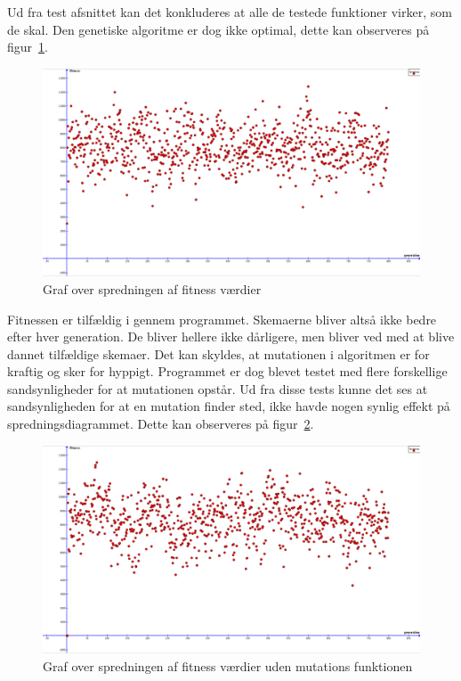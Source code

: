 Ud fra test afsnittet kan det konkluderes at alle de testede funktioner virker, som de skal. Den genetiske algoritme er dog ikke optimal, dette kan observeres på figur~\ref{fig:spredning}.
\begin{figure}[!h]
\centering
\includegraphics[scale = 0.2]{partials/graphics/spredning.png}
\caption{Graf over spredningen af fitness værdier}
\label{fig:spredning}
\end{figure}

Fitnessen er tilfældig i gennem programmet. Skemaerne bliver altså ikke bedre efter hver generation. De bliver hellere ikke dårligere, men bliver ved med at blive dannet tilfældige skemaer. Det kan skyldes, at mutationen i algoritmen er for kraftig og sker for hyppigt. Programmet er dog blevet testet med flere forskellige sandsynligheder for at mutationen opstår. Ud fra disse tests kunne det ses at sandsynligheden for at en mutation finder sted, ikke havde nogen synlig effekt på spredningsdiagrammet. Dette kan observeres på figur~\ref{fig:spredningudenmutation}.
\begin{figure}[!h]
\centering
\includegraphics[scale = 0.2]{partials/graphics/spredningudenmutation.png}
\caption{Graf over spredningen af fitness værdier uden mutations funktionen}
\label{fig:spredningudenmutation}
\end{figure}

